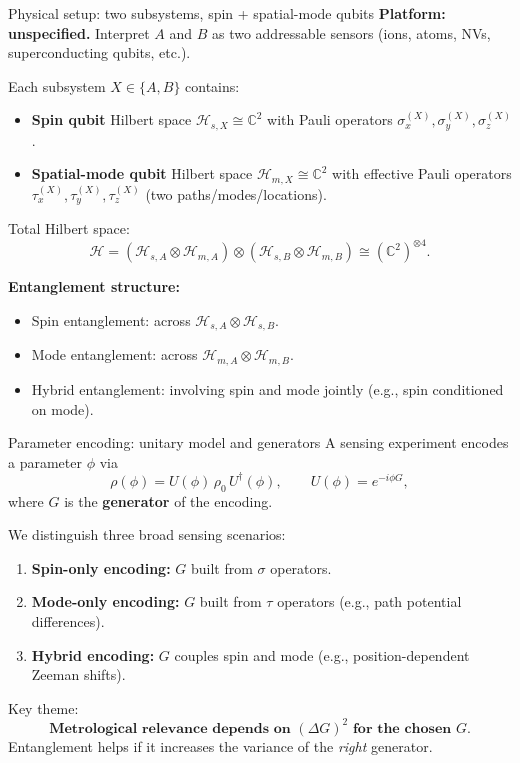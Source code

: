 \documentclass[aspectratio=169]{beamer}
\begin{document}
\begin{frame}{Physical setup: two subsystems, spin + spatial-mode qubits}
\small
\textbf{Platform: unspecified.}
Interpret $A$ and $B$ as two addressable sensors (ions, atoms, NVs, superconducting qubits, etc.).

\vspace{0.35em}
Each subsystem $X\in\{A,B\}$ contains:
\begin{itemize}
\item \textbf{Spin qubit} Hilbert space $\mathcal{H}_{s,X}\cong\mathbb{C}^2$ with Pauli operators
$\sigma_x^{(X)},\sigma_y^{(X)},\sigma_z^{(X)}$.
\item \textbf{Spatial-mode qubit} Hilbert space $\mathcal{H}_{m,X}\cong\mathbb{C}^2$ with effective Pauli operators
$\tau_x^{(X)},\tau_y^{(X)},\tau_z^{(X)}$ (two paths/modes/locations).
\end{itemize}

Total Hilbert space:
\[
\mathcal{H}
=
(\mathcal{H}_{s,A}\otimes \mathcal{H}_{m,A})
\otimes
(\mathcal{H}_{s,B}\otimes \mathcal{H}_{m,B})
\cong
(\mathbb{C}^2)^{\otimes 4}.
\]

\vspace{0.25em}
\textbf{Entanglement structure:}
\begin{itemize}
\item Spin entanglement: across $\mathcal{H}_{s,A}\otimes\mathcal{H}_{s,B}$.
\item Mode entanglement: across $\mathcal{H}_{m,A}\otimes\mathcal{H}_{m,B}$.
\item Hybrid entanglement: involving spin and mode jointly (e.g., spin conditioned on mode).
\end{itemize}
\end{frame}

\begin{frame}{Parameter encoding: unitary model and generators}
\small
A sensing experiment encodes a parameter $\phi$ via
\[
\rho(\phi)=U(\phi)\,\rho_0\,U^\dagger(\phi),
\qquad
U(\phi)=e^{-i\phi G},
\]
where $G$ is the \textbf{generator} of the encoding. \citep{BraunsteinCaves1994PRL,Paris2009IJQI,Pezze2018RMP}

\vspace{0.35em}
We distinguish three broad sensing scenarios:
\begin{enumerate}
\item \textbf{Spin-only encoding:} $G$ built from $\sigma$ operators.
\item \textbf{Mode-only encoding:} $G$ built from $\tau$ operators (e.g., path potential differences).
\item \textbf{Hybrid encoding:} $G$ couples spin and mode (e.g., position-dependent Zeeman shifts).
\end{enumerate}

\vspace{0.35em}
Key theme:
\[
\textbf{Metrological relevance depends on }(\Delta G)^2\textbf{ for the chosen }G.
\]
Entanglement helps if it increases the variance of the \emph{right} generator.
\end{frame}
\end{document}
